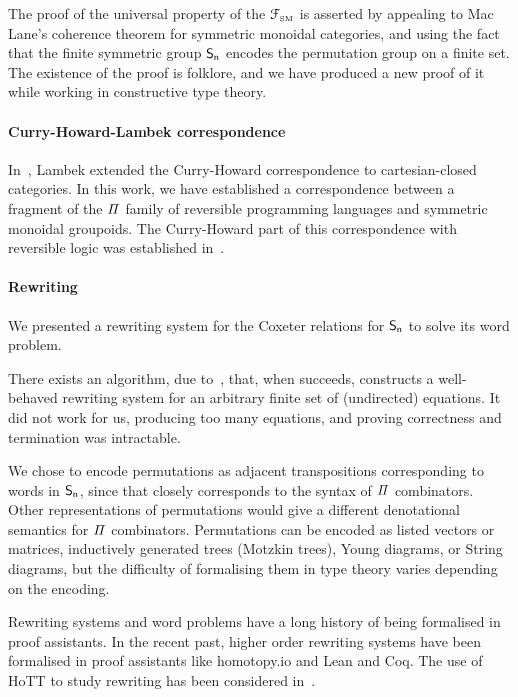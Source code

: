 The proof of the universal property of the $\FSM$ is asserted by appealing to Mac Lane's coherence theorem for symmetric
monoidal categories, and using the fact that the finite symmetric group $\Sn$ encodes the permutation group on a finite
set. The existence of the proof is folklore, and we have produced a new proof of it while working in constructive type
theory.

\paragraph{Curry-Howard-Lambek correspondence} In~\citet{curryCurryEssaysCombinatory1980}, Lambek extended the
Curry-Howard correspondence to cartesian-closed categories. In this work, we have established a correspondence between a
fragment of the $\mathit{\Pi}$ family of reversible programming languages and symmetric monoidal groupoids. The Curry-Howard
part of this correspondence with reversible logic was established in~\cite{sparksSuperstructuralReversibleLogic2014}.

\paragraph{Rewriting} We presented a rewriting system for the Coxeter relations for $\Sn$ to solve its word problem.

There exists an algorithm, due to~\citet{knuthSimpleWordProblems1970}, that, when succeeds, constructs a well-behaved
rewriting system for an arbitrary finite set of (undirected) equations. It did not work for us, producing too many
equations, and proving correctness and termination was intractable.

We chose to encode permutations as adjacent transpositions corresponding to words in $\Sn$, since that closely
corresponds to the syntax of $\mathit{\Pi}$ combinators. Other representations of permutations would give a different
denotational semantics for $\mathit{\Pi}$ combinators. Permutations can be encoded as listed vectors or matrices, inductively
generated trees (Motzkin trees), Young diagrams, or String diagrams, but the difficulty of formalising them in type
theory varies depending on the encoding.

Rewriting systems and word problems have a long history of being formalised in proof assistants. In the recent past,
higher order rewriting systems have been formalised in proof assistants like {homotopy.io} and Lean and Coq. The use of
HoTT to study rewriting has been considered in~\cite{krausCoherenceWellFoundednessTaming2020}.


